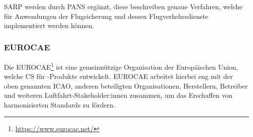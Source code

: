 \ac{SARP} werden durch \ac{PANS} ergänzt, diese beschreiben genaue Verfahren, welche für Anwendungen der Flugsicherung und dessen Flugverkehrsdienste implementiert werden können. 


\subsubsection{EUROCAE}
Die \acf{EUROCAE}\footnote{\href{https://www.eurocae.net/}{https://www.eurocae.net/}} ist eine gemeinnützige Organisation der Europäischen Union, welche \acf{CS} für \atmans-Produkte entwickelt. 
\ac{EUROCAE} arbeitet hierbei eng mit der oben genannten \ac{ICAO}, anderen beteiligten Organisationen, Herstellern, Betreiber und weiteren Luft\-fahrt-Stakeholder:innen zusammen, um das Erschaffen von harmonisierten Standards zu fördern.

